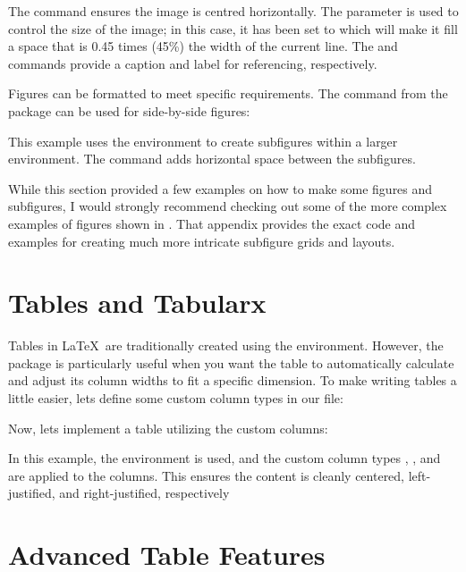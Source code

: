 		The  command ensures the image is centred horizontally.
		The  parameter is used to control the size of the image; in this case, it has been set to  which will make it fill a space that is 0.45 times (45\%) the width of the current line.
		The  and  commands provide a caption and label for referencing, respectively.

		Figures can be formatted to meet specific requirements. 
		The  command from the  package can be used for side-by-side figures:


		This example uses the  environment to create subfigures within a larger  environment. 
		The  command adds horizontal space between the subfigures.

		While this section provided a few examples on how to make some figures and subfigures, I would strongly recommend checking out some of the more complex examples of figures shown in .
		That appendix provides the exact code and examples for creating much more intricate subfigure grids and layouts.
		
	\section{Tables and Tabularx}
		Tables in \LaTeX\ are traditionally created using the  environment.
		However, the  package is particularly useful when you want the table to automatically calculate and adjust its column widths to fit a specific dimension. 
		To make writing tables a little easier, lets define some custom column types in our  file:

		

		Now, lets implement a table utilizing the  custom columns:


		In this example, the  environment is used, and the custom column types , , and  are applied to the columns. 
		This ensures the content is cleanly centered, left-justified, and right-justified, respectively

	\section{Advanced Table Features}

